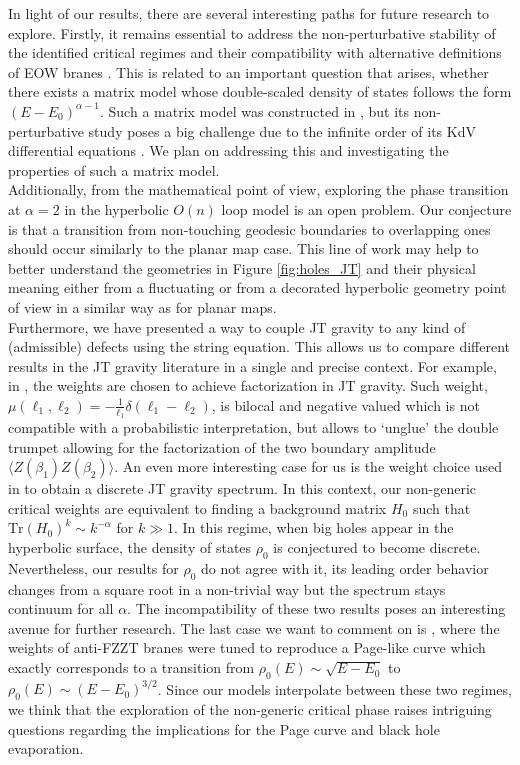 \documentclass[a4paper,11pt]{article}
\begin{document}
In light of our results, there are several interesting paths for future research to explore. 
Firstly, it remains essential to address the non-perturbative stability of the identified critical regimes and their compatibility with alternative definitions of EOW branes \cite{Johnson:2021tnl}.
This is related to an important question that arises, whether there exists a matrix model whose double-scaled density of states follows the form $(E-E_0)^{\alpha-1}$. Such a matrix model was constructed in \cite{Ambjorn:2016lkl}, but its non-perturbative study poses a big challenge due to the infinite order of its KdV differential equations \cite{Ambjorn:2017ibv}. We plan on addressing this and investigating the properties of such a matrix model.
\\
Additionally, from the mathematical point of view, exploring the phase transition at $\alpha=2$ in the hyperbolic $O(n)$ loop model is an open problem. Our conjecture is that a transition from non-touching geodesic boundaries to overlapping ones should occur similarly to the planar map case. This line of work may help to better understand the geometries in Figure \ref{fig:holes_JT} and their physical meaning either from a fluctuating or from a decorated hyperbolic geometry point of view in a similar way as for planar maps.\\
Furthermore, we have presented a way to couple JT gravity to any kind of (admissible) defects using the string equation. This allows us to compare different results in the JT gravity literature in a single and precise context. For example, in \cite{Blommaert:2021fob}, the weights are chosen to achieve factorization in JT gravity. Such weight, $\mu(\ell_1,\ell_2)=-\frac{1}{\ell_1}\delta(\ell_1-\ell_2)$, is bilocal and negative valued which is not compatible with a probabilistic interpretation, but allows to `unglue' the double trumpet allowing for the factorization of the two boundary amplitude $\langle Z(\beta_1) Z(\beta_2)\rangle$. An even more interesting case for us is the weight choice used in \cite{Blommaert:2021gha} to obtain a discrete JT gravity spectrum. In this context, our non-generic critical weights are equivalent to finding a background matrix $H_0$ such that $\mathrm{Tr}(H_0)^k\sim k^{-\alpha}$ for $k\gg 1$. In this regime, when big holes appear in the hyperbolic surface, the density of states $\rho_0$ is conjectured to become discrete. Nevertheless, our results for $\rho_0$ do not agree with it, its leading order behavior changes from a square root in a non-trivial way but the spectrum stays continuum for all $\alpha$. The incompatibility of these two results poses an interesting avenue for further research. The last case we want to comment on is \cite{Okuyama:2021Page}, where the weights of anti-FZZT branes were tuned to reproduce a Page-like curve which exactly corresponds to a transition from $\rho_0(E)\sim\sqrt{E-E_0}$ to $\rho_0(E)\sim (E-E_0)^{3/2}$. Since our models interpolate between these two regimes, we think that the exploration of the non-generic critical phase raises intriguing questions regarding the implications for the Page curve and black hole evaporation.\\
\end{document}
